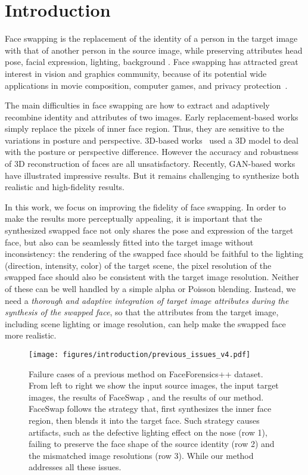 \section{Introduction}

Face swapping is the replacement of the identity of a person in the target image with that of another person in the source image, while preserving attributes \eg head pose, facial expression, lighting, background \etc. Face swapping has attracted great interest in vision and graphics community, because of its potential wide applications in movie composition, computer games, and privacy protection~\cite{ross2010visual}.

The main difficulties in face swapping are how to extract and adaptively recombine identity and attributes of two images. Early replacement-based works~\cite{bitouk2008face,wang2008facial} simply replace the pixels of inner face region. Thus, they are sensitive to the variations in posture and perspective. 3D-based works~\cite{blanz2004exchanging,cheng20093d,lin2012face,nirkin2018face} used a 3D model to deal with the posture or perspective difference. However the accuracy and robustness of 3D reconstruction of faces are all unsatisfactory. Recently, GAN-based works~\cite{korshunova2017fast,natsume2018fsnet,natsume2018rsgan,nirkin2019fsgan, bao2017cvae} have illustrated impressive results. But it remains challenging to synthesize both realistic and high-fidelity results. 

In this work, we focus on improving the fidelity of face swapping. 
In order to make the results more perceptually appealing, it is important that the synthesized swapped face not only shares the pose and expression of the target face, but also can be seamlessly fitted into the target image without inconsistency: the rendering of the swapped face should be faithful to the lighting (\eg direction, intensity, color) of the target scene, the pixel resolution of the swapped face should also be consistent with the target image resolution. 
Neither of these can be well handled by a simple alpha or Poisson blending.
Instead, we need a \emph{thorough and adaptive integration of target image attributes during the synthesis of the swapped face}, so that the attributes from the target image, including scene lighting or image resolution, can help make the swapped face more realistic.

\begin{figure}[t]
\centering
\texttt{[image: figures/introduction/previous\_issues\_v4.pdf]}
\caption{
Failure cases of a previous method on FaceForensics++ \cite{rossler2019faceforensics++} dataset. 
From left to right we show the input source images, the input target images, the results of FaceSwap \cite{faceswap}, and the results of our method.
FaceSwap follows the strategy that, first synthesizes the inner face region, then blends it into the target face. 
Such strategy causes artifacts, such as the defective lighting effect on the nose (row 1), failing to preserve the face shape of the source identity (row 2) and the mismatched image resolutions (row 3).  While our method addresses all these issues. 
}
\label{fig:existing_issues}
\vspace{-1em}
\end{figure}

